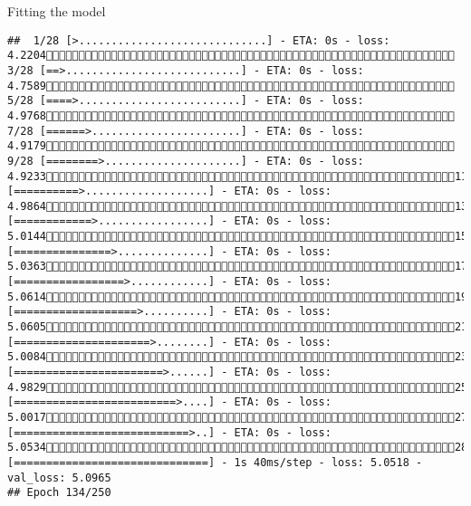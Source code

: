 \documentclass[
  ignorenonframetext,
]{beamer}
\begin{document}
\begin{frame}[fragile]{Fitting the model}
\begin{verbatim}
##  1/28 [>.............................] - ETA: 0s - loss: 4.2204 3/28 [==>...........................] - ETA: 0s - loss: 4.7589 5/28 [====>.........................] - ETA: 0s - loss: 4.9768 7/28 [======>.......................] - ETA: 0s - loss: 4.9179 9/28 [========>.....................] - ETA: 0s - loss: 4.923311/28 [==========>...................] - ETA: 0s - loss: 4.986413/28 [============>.................] - ETA: 0s - loss: 5.014415/28 [===============>..............] - ETA: 0s - loss: 5.036317/28 [=================>............] - ETA: 0s - loss: 5.061419/28 [===================>..........] - ETA: 0s - loss: 5.060521/28 [=====================>........] - ETA: 0s - loss: 5.008423/28 [=======================>......] - ETA: 0s - loss: 4.982925/28 [=========================>....] - ETA: 0s - loss: 5.001727/28 [===========================>..] - ETA: 0s - loss: 5.053428/28 [==============================] - 1s 40ms/step - loss: 5.0518 - val_loss: 5.0965
## Epoch 134/250

\end{verbatim}
\end{frame}
\end{document}
